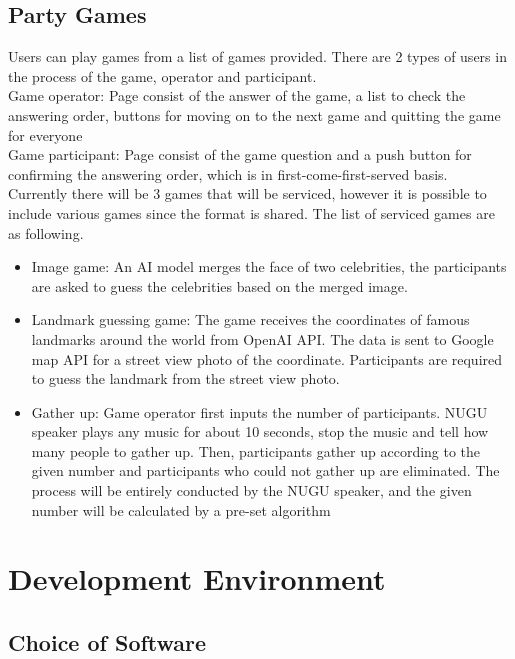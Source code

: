 \documentclass[conference]{IEEEtran}
\begin{document}
    \subsection{Party Games}
    Users can play games from a list of games provided. There are 2 types of users in the process of the game, operator and participant. \\
    
    Game operator: Page consist of the answer of the game, a list to check the answering order, buttons for moving on to the next game and quitting the game for everyone\\
    
    Game participant: Page consist of the game question and a push button for confirming the answering order, which is in first-come-first-served basis.\\
    
    Currently there will be 3 games that will be serviced, however it is possible to include various games since the format is shared. The list of serviced games are as following.\\

    \begin{itemize}
        \item Image game: An AI model merges the face of two celebrities, the participants are asked to guess the celebrities based on the merged image.
        \item Landmark guessing game: The game receives the coordinates of famous landmarks around the world from OpenAI API. The data is sent to Google map API for a street view photo of the coordinate. Participants are required to guess the landmark from the street view photo.
        \item Gather up: Game operator first inputs the number of participants. NUGU speaker plays any music for about 10 seconds, stop the music and tell how many people to gather up. Then, participants gather up according to the given number and participants who could not gather up are eliminated. The process will be entirely conducted by the NUGU speaker, and the given number will be calculated by a pre-set algorithm
    \end{itemize}
    
\section{Development Environment}
    \subsection{Choice of Software}
    
\end{document}

